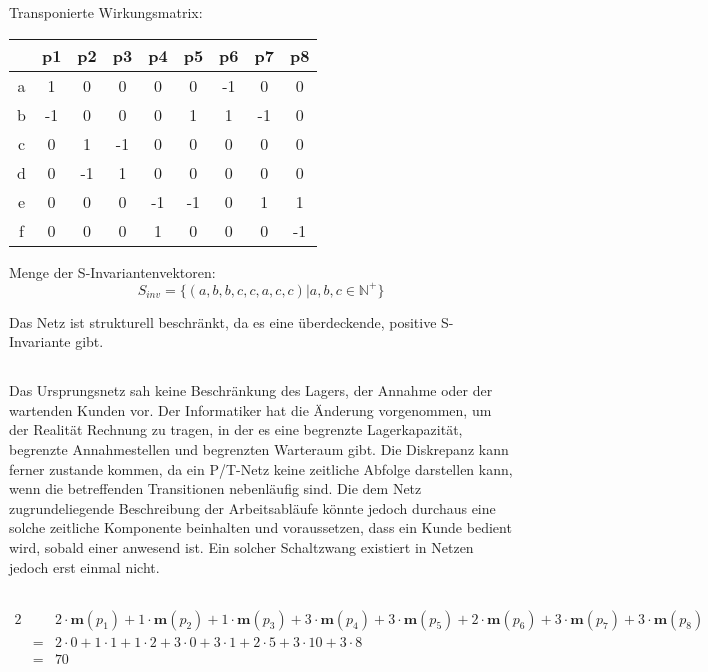 \documentclass[10pt,a4paper,oneside,ngerman,numbers=noenddot]{scrartcl}
\begin{document}
Transponierte Wirkungsmatrix:

\begin{tabular}{c|cccccccc}
	 & p1 & p2 & p3 & p4 & p5 & p6 & p7 & p8 \\
	\hline
	a & 1 & 0 & 0 & 0 & 0 & -1 & 0 & 0 \\
	b & -1 & 0 & 0 & 0 & 1 & 1 & -1 & 0\\
	c & 0 & 1 & -1 & 0 & 0 & 0 & 0 & 0\\
	d & 0 & -1 & 1 & 0 & 0 & 0 & 0 & 0\\
	e & 0 & 0 & 0 & -1 & -1 & 0 & 1 & 1\\
	f & 0 & 0 & 0 & 1 & 0 & 0 & 0 & -1
\end{tabular}

Menge der S-Invariantenvektoren:
\[
	S_{inv} = \{(a,b,b,c,c,a,c,c)| a,b,c \in \mathbb{N}^{+}\}
\]

Das Netz ist strukturell beschränkt, da es eine überdeckende, positive S-Invariante gibt.

\subsection{}
Das Ursprungsnetz sah keine Beschränkung des Lagers, der Annahme oder der wartenden Kunden vor. Der Informatiker hat die Änderung vorgenommen, um der Realität Rechnung zu tragen, in der es eine begrenzte Lagerkapazität, begrenzte Annahmestellen und begrenzten Warteraum gibt. Die Diskrepanz kann ferner zustande kommen, da ein P/T-Netz keine zeitliche Abfolge darstellen kann, wenn die betreffenden Transitionen nebenläufig sind. Die dem Netz zugrundeliegende Beschreibung der Arbeitsabläufe könnte jedoch durchaus eine solche zeitliche Komponente beinhalten und voraussetzen, dass ein Kunde bedient wird, sobald einer anwesend ist. Ein solcher Schaltzwang existiert in Netzen jedoch erst einmal nicht.

\subsection{}
\begin{alignat*}{2}
&& 2 \cdot \textbf{m}(p_1) + 1 \cdot \textbf{m}(p_2) + 1 \cdot \textbf{m}(p_3) + 3 \cdot \textbf{m}(p_4) + 3 \cdot \textbf{m}(p_5) + 2 \cdot \textbf{m}(p_6) + 3 \cdot \textbf{m}(p_7) + 3 \cdot \textbf{m}(p_8) \\
&=& 2 \cdot 0 + 1 \cdot 1 + 1 \cdot 2 + 3 \cdot 0 + 3 \cdot 1 + 2 \cdot 5 + 3 \cdot 10 + 3 \cdot 8 \\
&=& 70
\end{alignat*}
\end{document}
